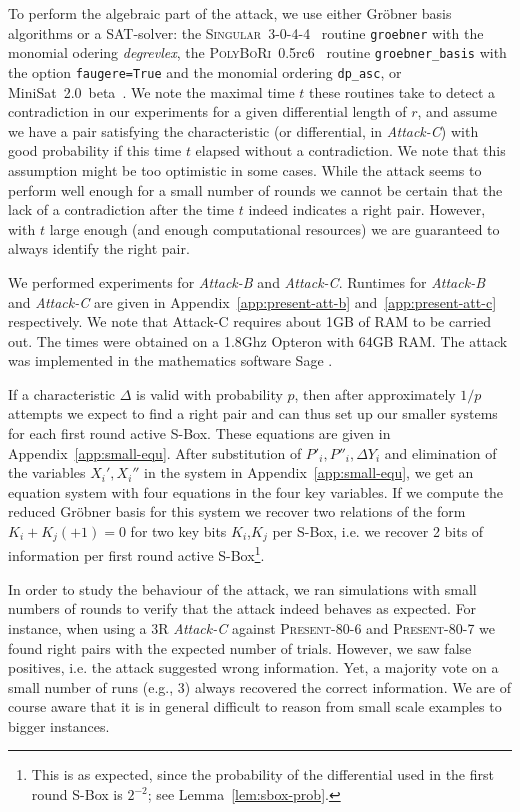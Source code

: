 \documentclass{llncs}
\newcommand{\PRESENT}{\textsc{Present}\xspace}
\begin{document}
To perform the algebraic part of the attack, we use either Gröbner basis
algorithms or a SAT-solver: the
\textsc{Singular}~3-0-4-4~\cite{singular} routine \texttt{groebner} with the
monomial
odering \emph{degrevlex}, the \textsc{PolyBoRi}~0.5rc6~\cite{polybori} routine
\texttt{groebner\_basis} with the option \texttt{faugere=True} and the monomial
ordering \texttt{dp\_asc}, or MiniSat~2.0~beta~\cite{minisat}.
We note the maximal time $t$ these routines take to detect a contradiction in
our experiments for a
given differential length of $r$, and assume we have a pair satisfying the
characteristic (or differential, in \emph{Attack-C}) with good probability if
this time $t$ elapsed without a contradiction. We note that this
assumption might be too optimistic in some cases. While the attack seems to
perform well
enough for a small number of rounds we cannot be certain that the lack of a
contradiction after the time $t$ indeed indicates a right pair. However, with
$t$ large enough (and enough computational resources) we are guaranteed to
always identify the right pair.

We performed experiments for \emph{Attack-B} and
\emph{Attack-C}. Runtimes for \emph{Attack-B} and \emph{Attack-C} are given in
Appendix~\ref{app:present-att-b} and~\ref{app:present-att-c} respectively. We
note that Attack-C requires about 1GB of RAM to be carried out.
The times were obtained on a 1.8Ghz Opteron with 64GB
RAM. The attack was implemented in the mathematics software Sage \cite{sage}.

If a characteristic $\Delta$ is valid with probability $p$, then after
approximately $1/p$ attempts we expect to find a right pair and can thus
set up our smaller systems for each first round active S-Box. These equations
are given in Appendix~\ref{app:small-equ}. After substitution of $P'_i, P''_i,
\Delta Y_i$ and elimination of the variables $X_i', X_i''$ in the system in
Appendix~\ref{app:small-equ}, we get an equation system with four equations in
the four key variables. If we compute the reduced Gr\"obner basis for this
system we recover two relations of the form $K_i + K_j (+1) = 0$ for two key
bits $K_i$,$K_j$ per S-Box, i.e. we recover 2 bits of information per first
round active S-Box\footnote{This is as expected, since the probability of
the differential used in the first round S-Box is $2^{-2}$; see
Lemma~\ref{lem:sbox-prob}.}.

In order to  study the behaviour of the attack, we ran simulations with small
numbers of rounds to verify that the attack indeed behaves as expected. For
instance, when using a 3R \emph{Attack-C} against \PRESENT-80-6 and
\PRESENT-80-7 we found right pairs with the expected number of trials. However,
we saw false positives, i.e. the attack suggested wrong information. Yet, a
majority vote on a small number of runs (e.g., 3) always recovered the correct
information. We are of course aware that it is in general difficult to reason
from small scale examples to bigger instances.
\end{document}
